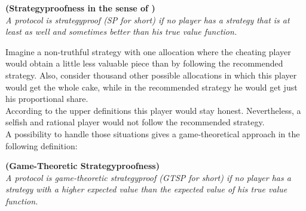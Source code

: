 \begin{defi}{\textbf{(Strategyproofness in the sense of \cite{note})}}\\
\emph{A protocol is \emph{strategyproof} (SP for short) if no player has a strategy that is at least as well and sometimes better than his true value function.}
\end{defi}
Imagine a non-truthful strategy with one allocation where the cheating player would obtain a little less valuable piece than by following the recommended strategy.
Also, consider thousand other possible allocations in which this player would get the whole cake, while in the recommended strategy he would get just his proportional share.\\
%
According to the upper definitions this player would stay honest. Nevertheless, a selfish and rational player would not follow the recommended strategy.\\
A possibility to handle those situations gives a game-theoretical approach in the following definition:
\begin{defi}{\textbf{(Game-Theoretic Strategyproofness)}}\\
\emph{A protocol is \emph{game-theoretic strategyproof} (GTSP for short) if no player has a strategy with a higher expected value than the expected value of his true value function.}
\end{defi}

